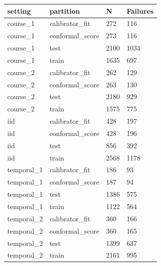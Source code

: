 \begin{tabular}{llll}
\toprule
setting & partition & N & Failures\\
\midrule
course\_1 & calibrator\_fit & 272 & 116\\
course\_1 & conformal\_score & 273 & 116\\
course\_1 & test & 2100 & 1034\\
course\_1 & train & 1635 & 697\\
course\_2 & calibrator\_fit & 262 & 129\\
course\_2 & conformal\_score & 263 & 130\\
course\_2 & test & 2180 & 929\\
course\_2 & train & 1575 & 775\\
iid & calibrator\_fit & 428 & 197\\
iid & conformal\_score & 428 & 196\\
iid & test & 856 & 392\\
iid & train & 2568 & 1178\\
temporal\_1 & calibrator\_fit & 186 & 93\\
temporal\_1 & conformal\_score & 187 & 94\\
temporal\_1 & test & 1386 & 575\\
temporal\_1 & train & 1122 & 564\\
temporal\_2 & calibrator\_fit & 360 & 166\\
temporal\_2 & conformal\_score & 360 & 165\\
temporal\_2 & test & 1399 & 637\\
temporal\_2 & train & 2161 & 995\\
\bottomrule
\end{tabular}